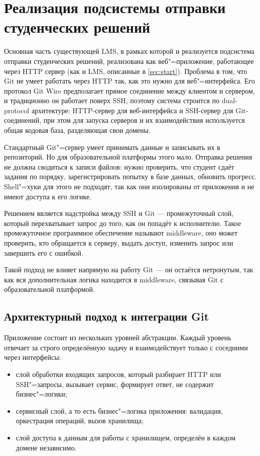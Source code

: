 \documentclass[coursework]{SCWorks}
\begin{document}
\section{Реализация подсистемы отправки студенческих решений}

Основная часть существующей LMS, в рамках которой и реализуется подсистема отправки студенческих решений, реализована как веб"=приложение, работающее через HTTP сервер (как и LMS, описанные в \ref{sec:start}). Проблема в том, что Git не умеет работать через HTTP так, как это нужно для веб"=интерфейса. Его протокол Git Wire предполагает прямое соединение между клиентом и сервером, и традиционно он работает поверх SSH, поэтому система строится по dual-protocol архитектуре: HTTP-сервер для веб-интерфейса и SSH-сервер для Git-соединений, при этом для запуска серверов и их взаимодействия используется общая кодовая база, разделяющая свои домены.

Стандартный Git"=сервер умеет принимать данные и записывать их в репозиторий. Но для образовательной платформы этого мало. Отправка решения не должна сводиться к записи файлов: нужно проверить, что студент сдаёт задания по порядку, зарегистрировать попытку в базе данных, обновить прогресс. Shell"=хуки для этого не подходят, так как они изолированы от приложения и не имеют доступа к его логике.

Решением является надстройка между SSH и Git --- промежуточный слой, который перехватывает запрос до того, как он попадёт к исполнителю. Такое промежуточное программное обеспечение называют middleware, оно может проверить, кто обращается к серверу, выдать доступ, изменить запрос или завершить его с ошибкой.

Такой подход не влияет напрямую на работу Git --- он остаётся нетронутым, так как вся дополнительная логика находится в middleware, связывая Git с образовательной платформой.

\subsection{Архитектурный подход к интеграции Git}

Приложение состоит из нескольких уровней абстракции. Каждый уровень отвечает за строго определённую задачу и взаимодействует только с соседними через интерфейсы:

\begin{itemize}
	\item слой обработки входящих запросов, который разбирает HTTP или SSH"=запросы, вызывает сервис, формирует ответ, не содержит бизнес"=логики;
	\item сервисный слой, а то есть бизнес"=логика приложения: валидация, оркестрация операций, вызов хранилища;
	\item слой доступа к данным для работы с хранилищем, определён в каждом домене независимо.
\end{itemize}
\end{document}
